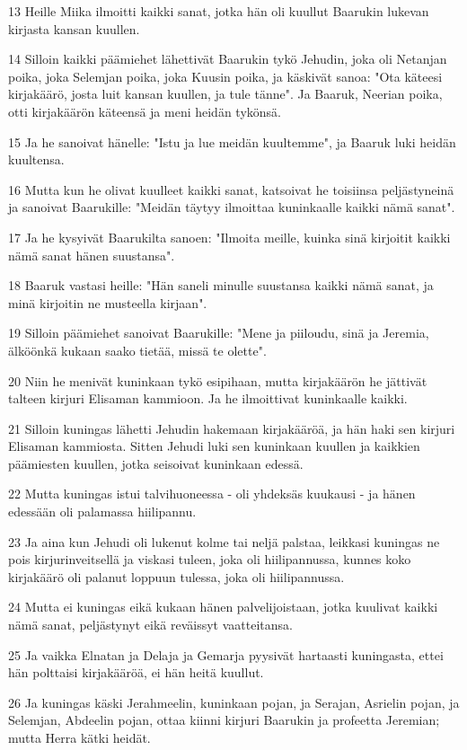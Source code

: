 \par 13 Heille Miika ilmoitti kaikki sanat, jotka hän oli kuullut Baarukin lukevan kirjasta kansan kuullen.
\par 14 Silloin kaikki päämiehet lähettivät Baarukin tykö Jehudin, joka oli Netanjan poika, joka Selemjan poika, joka Kuusin poika, ja käskivät sanoa: "Ota käteesi kirjakäärö, josta luit kansan kuullen, ja tule tänne". Ja Baaruk, Neerian poika, otti kirjakäärön käteensä ja meni heidän tykönsä.
\par 15 Ja he sanoivat hänelle: "Istu ja lue meidän kuultemme", ja Baaruk luki heidän kuultensa.
\par 16 Mutta kun he olivat kuulleet kaikki sanat, katsoivat he toisiinsa peljästyneinä ja sanoivat Baarukille: "Meidän täytyy ilmoittaa kuninkaalle kaikki nämä sanat".
\par 17 Ja he kysyivät Baarukilta sanoen: "Ilmoita meille, kuinka sinä kirjoitit kaikki nämä sanat hänen suustansa".
\par 18 Baaruk vastasi heille: "Hän saneli minulle suustansa kaikki nämä sanat, ja minä kirjoitin ne musteella kirjaan".
\par 19 Silloin päämiehet sanoivat Baarukille: "Mene ja piiloudu, sinä ja Jeremia, älköönkä kukaan saako tietää, missä te olette".
\par 20 Niin he menivät kuninkaan tykö esipihaan, mutta kirjakäärön he jättivät talteen kirjuri Elisaman kammioon. Ja he ilmoittivat kuninkaalle kaikki.
\par 21 Silloin kuningas lähetti Jehudin hakemaan kirjakääröä, ja hän haki sen kirjuri Elisaman kammiosta. Sitten Jehudi luki sen kuninkaan kuullen ja kaikkien päämiesten kuullen, jotka seisoivat kuninkaan edessä.
\par 22 Mutta kuningas istui talvihuoneessa - oli yhdeksäs kuukausi - ja hänen edessään oli palamassa hiilipannu.
\par 23 Ja aina kun Jehudi oli lukenut kolme tai neljä palstaa, leikkasi kuningas ne pois kirjurinveitsellä ja viskasi tuleen, joka oli hiilipannussa, kunnes koko kirjakäärö oli palanut loppuun tulessa, joka oli hiilipannussa.
\par 24 Mutta ei kuningas eikä kukaan hänen palvelijoistaan, jotka kuulivat kaikki nämä sanat, peljästynyt eikä reväissyt vaatteitansa.
\par 25 Ja vaikka Elnatan ja Delaja ja Gemarja pyysivät hartaasti kuningasta, ettei hän polttaisi kirjakääröä, ei hän heitä kuullut.
\par 26 Ja kuningas käski Jerahmeelin, kuninkaan pojan, ja Serajan, Asrielin pojan, ja Selemjan, Abdeelin pojan, ottaa kiinni kirjuri Baarukin ja profeetta Jeremian; mutta Herra kätki heidät.
